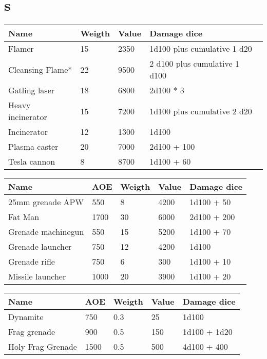\documentclass{report}
\begin{document}
\begin{table}[H]
\begin{table}[H]
\begin{table}[H]
\begin{table}[H]
\begin{table}[H]
\begin{table}[H]
\begin{table}[H]
\chapter{s}
\begin{table}[H]
  \centering
  \begin{tabular}{p{30mm}p{30mm}p{30mm}p{30mm}}
\bfseries Name & \bfseries Weigth & \bfseries Value & \bfseries Damage dice \\
\hline
Flamer  & 15 & 2350 & 1d100 plus  cumulative  1 d20 \\
Cleansing Flame* & 22 & 9500 & 2 d100 plus  cumulative  1 d100 \\
Gatling laser  & 18 & 6800 & 2d100 * 3 \\
Heavy incinerator  & 15 & 7200 & 1d100 plus  cumulative 2 d20   \\
Incinerator  & 12 & 1300 & 1d100 \\
Plasma caster  & 20 & 7000 & 2d100 + 100 \\
Tesla cannon  & 8 & 8700 & 1d100 + 60 \\
  \end{tabular}
\begin{table}[H]
  \centering
  \begin{tabular}{p{30mm}p{30mm}p{30mm}p{30mm}p{30mm}}
\bfseries Name & \bfseries AOE & \bfseries Weigth & \bfseries Value & \bfseries Damage dice \\
\hline
25mm grenade APW  & 550 & 8 & 4200 & 1d100 + 50 \\
Fat Man & 1700 & 30 & 6000 & 2d100 + 200 \\
Grenade machinegun  & 550 & 15 & 5200 & 1d100 + 70 \\
Grenade launcher  & 750 & 12 & 4200 & 1d100 \\
Grenade rifle  & 750 & 6 & 300 & 1d100 + 10 \\
Missile launcher  & 1000 & 20 & 3900 & 1d100  + 20 \\
  \end{tabular}
\begin{table}[H]
  \centering
  \begin{tabular}{p{30mm}p{30mm}p{30mm}p{30mm}p{30mm}}
\bfseries Name & \bfseries AOE & \bfseries Weigth & \bfseries Value & \bfseries Damage dice \\
\hline
Dynamite  & 750 & 0.3  & 25 & 1d100 \\
Frag grenade  & 900 & 0.5  & 150 & 1d100 + 1d20 \\
Holy Frag Grenade & 1500 & 0.5  & 500 & 4d100 + 400 \\

\end{tabular}
\end{table}
\end{table}
\end{table}
\end{table}
\end{table}
\end{table}
\end{table}
\end{table}
\end{table}
\end{table}
\end{document}
